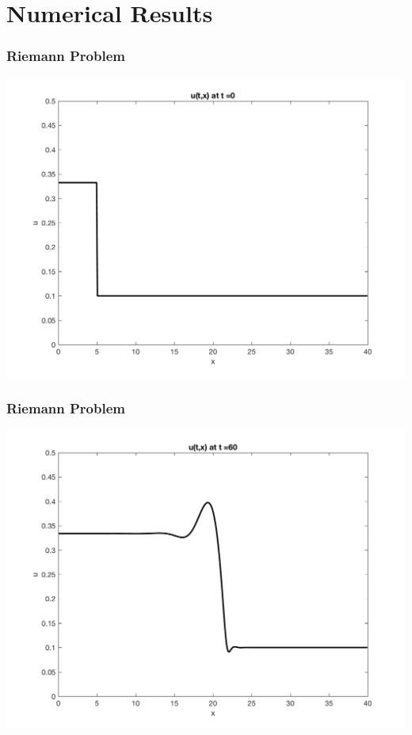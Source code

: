 \documentclass[10pt]{beamer}
\begin{document}
  \section{Numerical Results}
    \begin{frame}
      \frametitle{Riemann Problem}
      \begin{center}
        \includegraphics[scale=0.5]{Figures/reimann0.png}
      \end{center}
    \end{frame}
    \begin{frame}
      \frametitle{Riemann Problem}
      \begin{center}
        \includegraphics[scale=0.5]{Figures/reimann60.png}
      \end{center}
    \end{frame}
\end{document}
